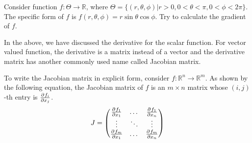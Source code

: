 \begin{exercise}
Consider function $f: \Theta \to \mathbb{R}$, where $\Theta = \{(r, \theta, \phi)| r>0, 0<\theta<\pi, 0<\phi < 2\pi\}$. The specific form of $f$ is $f(r, \theta,\phi) = r \sin \theta \cos\phi$. Try to calculate the gradient of $f$.
\end{exercise}

In the above, we have discussed the derivative for the scalar function. For vector valued function, the derivative is a matrix instead of a vector and the derivative matrix has another commonly used name called Jacobian matrix.

To write the Jacobian matrix in explicit form, consider $f: \mathbb{R}^n \to \mathbb{R}^m$. As shown by the following equation, the Jacobian matrix of $f$ is an $m\times n$ matrix whose $(i,j)$-th entry is $\frac{\partial^{} f_i}{\partial x_j}$.
\begin{equation}
J = \begin{pmatrix}
\frac{\partial^{} f_1}{\partial x_1} & \dots & \frac{\partial^{} f_1}{\partial x_n} \\
\vdots & \ddots & \vdots \\
\frac{\partial^{} f_m}{\partial x_1} & \dots & \frac{\partial^{} f_m}{\partial x_n}
\end{pmatrix}
\end{equation}